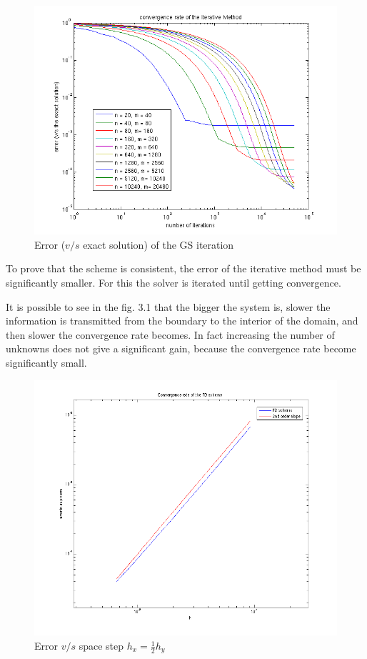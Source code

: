 \documentclass{article}
\numberwithin{equation}{section}
\begin{document}
\begin{enumerate}[label=(\alph*)]
        \begin{figure}[!htbp]
            \centering
            \includegraphics[width=15cm]{./p-set1/inform-1.png}
            \caption{Error ($v/s$ exact solution) of the GS iteration}
        \end{figure}
        To prove that the scheme is consistent, the error of the iterative method must be significantly smaller. For this the solver is iterated until getting convergence.

        It is possible to see in the fig. 3.1 that the bigger the system is, slower the information is transmitted from the boundary to the interior of the domain, and then slower the convergence rate becomes. In fact increasing the number of unknowns does not give a significant gain, because the convergence rate become significantly small.

        \begin{figure}[!htbp]
            \centering
            \includegraphics[width=15cm]{./p-set1/inform-2.png}
            \caption{Error $v/s$ space step $h_x = \frac{1}{2}h_y$}
        \end{figure}


\end{enumerate}
\end{document}
